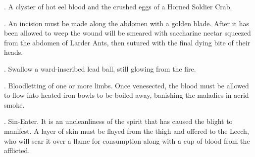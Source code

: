 {{

  \hrulefill

  \item {}.  A clyster of hot eel blood and the crushed eggs of a Horned Soldier Crab. 


\hrulefill



  \item {}. An incision must be made along the abdomen  with a golden blade. After it has been allowed to weep the wound will be smeared with saccharine nectar squeezed from the abdomen of Larder Ants, then sutured with the final dying bite of their heads. 


\hrulefill



  \item {}. Swallow a ward-inscribed lead ball, still glowing from the fire. 


\hrulefill



  \item {}. Bloodletting of one or more limbs. Once venesected, the blood must be allowed to flow into heated iron bowls to be boiled away, banishing the maladies in acrid smoke. 


\hrulefill



  \item {}. Sin-Eater. It is an uncleanliness of the spirit that has caused the blight to manifest. A layer of skin must be flayed from the thigh and offered to the Leech, who will sear it over a flame for consumption along with a cup of blood from the afflicted. 


}}
